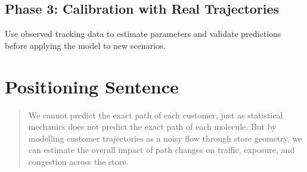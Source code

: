 \documentclass[11pt,a4paper]{article}
\begin{document}
\subsection*{Phase 3: Calibration with Real Trajectories}

Use observed tracking data to estimate parameters and validate predictions before applying the model to new scenarios.

\section{Positioning Sentence}

\begin{quote}
We cannot predict the exact path of each customer, just as statistical mechanics does not predict the exact path of each molecule. But by modelling customer trajectories as a noisy flow through store geometry, we can estimate the overall impact of path changes on traffic, exposure, and congestion across the store.
\end{quote}
\end{document}
